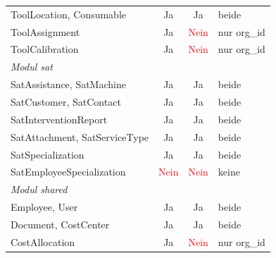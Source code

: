 \begin{table}[H]
\begin{center}
\begin{tabular}{|l|c|c|l|}
            ToolLocation, Consumable      & \textcolor{green!60!black}{Ja} & \textcolor{green!60!black}{Ja} & beide                        \\
            ToolAssignment                & \textcolor{green!60!black}{Ja} & \textcolor{red}{Nein}          & nur org\_id                  \\
            ToolCalibration               & \textcolor{green!60!black}{Ja} & \textcolor{red}{Nein}          & nur org\_id                  \\
            \hline
            \multicolumn{4}{|l|}{\textit{Modul sat}}                                                                                       \\
            \hline
            SatAssistance, SatMachine     & \textcolor{green!60!black}{Ja} & \textcolor{green!60!black}{Ja} & beide                        \\
            SatCustomer, SatContact       & \textcolor{green!60!black}{Ja} & \textcolor{green!60!black}{Ja} & beide                        \\
            SatInterventionReport         & \textcolor{green!60!black}{Ja} & \textcolor{green!60!black}{Ja} & beide                        \\
            SatAttachment, SatServiceType & \textcolor{green!60!black}{Ja} & \textcolor{green!60!black}{Ja} & beide                        \\
            SatSpecialization             & \textcolor{green!60!black}{Ja} & \textcolor{green!60!black}{Ja} & beide                        \\
            SatEmployeeSpecialization     & \textcolor{red}{Nein}          & \textcolor{red}{Nein}          & keine                        \\
            \hline
            \multicolumn{4}{|l|}{\textit{Modul shared}}                                                                                    \\
            \hline
            Employee, User                & \textcolor{green!60!black}{Ja} & \textcolor{green!60!black}{Ja} & beide                        \\
            Document, CostCenter          & \textcolor{green!60!black}{Ja} & \textcolor{green!60!black}{Ja} & beide                        \\
            CostAllocation                & \textcolor{green!60!black}{Ja} & \textcolor{red}{Nein}          & nur org\_id                  \\

\end{tabular}
\end{center}
\end{table}
